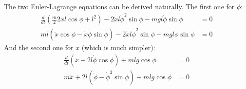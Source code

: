 The two Euler-Lagrange equations can be derived naturally. The first one for $\phi$: 
\begin{align}
    \frac{d}{dt} \left( \frac{m}{2} 2\dot{x}l \cos{\phi} + l^{2} \right) -2\dot{x}l \dot{\phi}^{2}\sin{\phi}- mgl \dot{\phi}\sin{\phi} &= 0\\
    ml \left( \ddot{x}\cos{\phi} - \dot{x}\dot{\phi}\sin{\phi} \right) - 2\dot{x}l \dot{\phi}^{2}\sin{\phi}- mgl \dot{\phi}\sin{\phi} & = 0
\end{align}
And the second one for $x$ (which is much simpler): 
\begin{align}
    \frac{d}{dt} \left(\ddot{x}+ 2l \dot{\phi}\cos{\phi}\right) + mlg \cos{\phi} & = 0 \\
    m\dddot{x} + 2l \left( \ddot{\phi} - \dot{\phi}^{2}\sin{\phi} \right) + mlg\cos{\phi} & = 0
\end{align}
